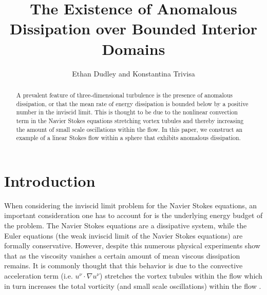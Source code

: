 \documentclass[11pt, reqno]{article}
\title{The Existence of Anomalous Dissipation over Bounded Interior Domains}
\author{Ethan Dudley\footnotemark[2]\; and Konstantina Trivisa\footnotemark[2]\;\footnotemark[1]}
\def\grad{\nabla}
\begin{document}
\maketitle
\renewcommand{\thefootnote}{\fnsymbol{footnote}}
\begin{abstract}
   A prevalent feature of three-dimensional turbulence is the presence of anomalous dissipation, or that the mean rate of energy dissipation is bounded below by a positive number in the inviscid limit. This is thought to be due to the nonlinear convection term in the Navier Stokes equations stretching vortex tubules and thereby increasing the amount of small scale oscillations within the flow. In this paper, we construct an example of a linear Stokes flow within a sphere that exhibits anomalous dissipation. 
\end{abstract}

\tableofcontents
\section{Introduction}

When considering the inviscid limit problem for the Navier Stokes equations, an important consideration one has to account for is the underlying energy budget of the problem. The Navier Stokes equations are a dissipative system, while the Euler equations (the weak inviscid limit of the Navier Stokes equations) are formally conservative. However, despite this numerous physical experiments \cites{touil2002decay, pearson2002measurements,  sreenivasan1984scaling, frisch1995turbulence} show that as the viscosity vanishes a certain amount of mean viscous dissipation remains. It is commonly thought that this behavior is due to the convective acceleration term (i.e. $u^\nu \cdot \grad u^\nu$) stretches the vortex tubules within the flow  which in turn increases the total vorticity (and small scale oscillations) within the flow \cite{onsager1949statistical}. 
\end{document}
